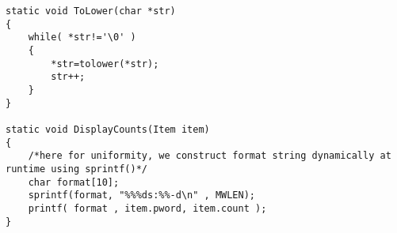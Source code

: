 \begin{solution}
\begin{verbatim}
static void ToLower(char *str)
{
	while( *str!='\0' )
	{
		*str=tolower(*str);
		str++;
	}
}

static void DisplayCounts(Item item)
{
	/*here for uniformity, we construct format string dynamically at runtime using sprintf()*/
	char format[10];
	sprintf(format, "%%%ds:%%-d\n" , MWLEN);
	printf( format , item.pword, item.count );
}
  \end{verbatim}
\end{solution}
